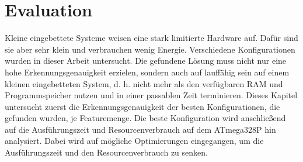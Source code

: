 \chapter{Evaluation}
Kleine eingebettete Systeme weisen eine stark limitierte Hardware auf. Dafür sind sie aber sehr klein und verbrauchen wenig Energie. Verschiedene Konfigurationen wurden in dieser Arbeit untersucht. Die gefundene
Lösung muss nicht nur eine hohe Erkennungsgenauigkeit erzielen, sondern auch auf lauffähig sein auf einem kleinen eingebetteten System, d. h. nicht mehr als den verfügbaren RAM und Programmspeicher nutzen und in
einer passablen Zeit terminieren.
\newline
\newline
Dieses Kapitel untersucht zuerst die Erkennungsgenauigkeit der besten Konfigurationen, die gefunden wurden, je Featuremenge. Die beste Konfiguration wird anschließend auf die Ausführungszeit
und Resourcenverbrauch auf dem ATmega328P hin analysiert. Dabei wird auf mögliche Optimierungen eingegangen, um die Ausführungszeit und den Resourcenverbrauch zu senken.



